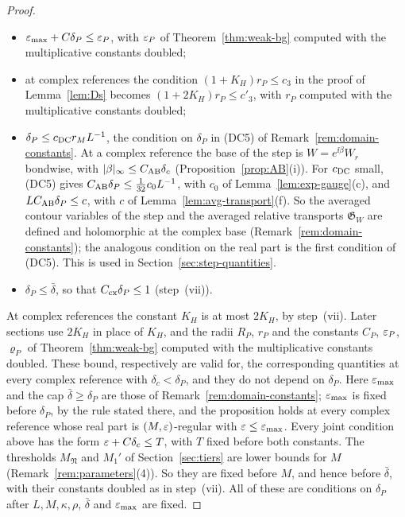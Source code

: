 \begin{proof}
\begin{itemize}
\item $\varepsilon_{\max}+C\delta_P\le\varepsilon_P$, with $\varepsilon_P$ of Theorem~\ref{thm:weak-bg} computed with the multiplicative constants doubled;
\item at complex references the condition $(1+K_H)r_P\le c_3$ in the proof of Lemma~\ref{lem:Ds} becomes $(1+2K_H)r_P\le c'_3$, with $r_P$ computed with the multiplicative constants doubled;
\item $\delta_P\le c_{\rm DC}r_ML^{-1}$, the condition on $\delta_P$ in (DC5) of Remark~\ref{rem:domain-constants}. At a complex reference the base of the step is $W=e^{\ii\beta}W_r$ bondwise, with $|\beta|_\infty\le C_{\rm AB}\delta_c$ (Proposition~\ref{prop:AB}(i)). For $c_{\rm DC}$ small, (DC5) gives $C_{\rm AB}\delta_P\le\frac1{32}c_0L^{-1}$, with $c_0$ of Lemma~\ref{lem:exp-gauge}(c), and $LC_{\rm AB}\delta_P\le c$, with $c$ of Lemma~\ref{lem:avg-transport}(f). So the averaged contour variables of the step and the averaged relative transports $\mathfrak G_W$ are defined and holomorphic at the complex base (Remark~\ref{rem:domain-constants}); the analogous condition on the real part is the first condition of (DC5). This is used in Section~\ref{sec:step-quantities}.
\item $\delta_P\le\bar\delta$, so that $C_{\rm cx}\delta_P\le1$ (step~(vii)).
\end{itemize}
At complex references the constant $K_H$ is at most $2K_H$, by step~(vii). Later sections use $2K_H$ in place of $K_H$, and the radii $R_P$, $r_P$ and the constants $C_P$, $\varepsilon_P$, $\varrho_P$ of Theorem~\ref{thm:weak-bg} computed with the multiplicative constants doubled. These bound, respectively are valid for, the corresponding quantities at every complex reference with $\delta_c<\delta_P$, and they do not depend on $\delta_P$. Here $\varepsilon_{\max}$ and the cap $\bar\delta\ge\delta_P$ are those of Remark~\ref{rem:domain-constants}; $\varepsilon_{\max}$ is fixed before $\delta_P$, by the rule stated there, and the proposition holds at every complex reference whose real part is $(M,\varepsilon)$-regular with $\varepsilon\le\varepsilon_{\max}$. Every joint condition above has the form $\varepsilon+C\delta_c\le T$, with $T$ fixed before both constants. The thresholds $M_{\mathfrak N}$ and $M_1'$ of Section~\ref{sec:tiers} are lower bounds for $M$ (Remark~\ref{rem:parameters}(4)). So they are fixed before $M$, and hence before $\bar\delta$, with their constants doubled as in step~(vii).
All of these are conditions on $\delta_P$ after $L,M,\kappa,\rho$, $\bar\delta$ and $\varepsilon_{\max}$ are fixed.
\end{proof}

